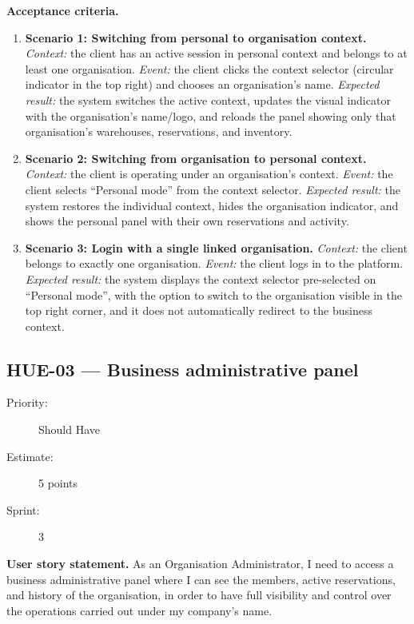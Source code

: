\documentclass[11pt,a4paper,oneside]{report}
\begin{document}
\textbf{Acceptance criteria.}
\begin{enumerate}
\item \textbf{Scenario 1: Switching from personal to organisation context.} \emph{Context:} the client has an active session in personal context and belongs to at least one organisation. \emph{Event:} the client clicks the context selector (circular indicator in the top right) and chooses an organisation's name. \emph{Expected result:} the system switches the active context, updates the visual indicator with the organisation's name/logo, and reloads the panel showing only that organisation's warehouses, reservations, and inventory.
\item \textbf{Scenario 2: Switching from organisation to personal context.} \emph{Context:} the client is operating under an organisation's context. \emph{Event:} the client selects ``Personal mode'' from the context selector. \emph{Expected result:} the system restores the individual context, hides the organisation indicator, and shows the personal panel with their own reservations and activity.
\item \textbf{Scenario 3: Login with a single linked organisation.} \emph{Context:} the client belongs to exactly one organisation. \emph{Event:} the client logs in to the platform. \emph{Expected result:} the system displays the context selector pre-selected on ``Personal mode'', with the option to switch to the organisation visible in the top right corner, and it does not automatically redirect to the business context.
\end{enumerate}

\subsection{HUE-03 --- Business administrative panel}
\label{req:HUE-03}
\begin{description}
\item[Priority:] Should Have \quad \item[Estimate:] 5 points \quad \item[Sprint:] 3
\end{description}

\textbf{User story statement.} As an Organisation Administrator, I need to access a business administrative panel where I can see the members, active reservations, and history of the organisation, in order to have full visibility and control over the operations carried out under my company's name.
\end{document}
